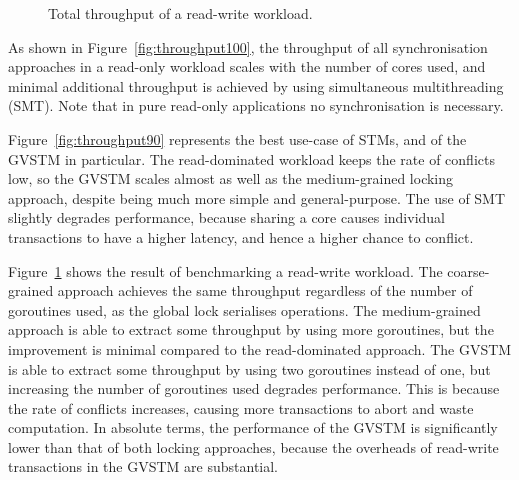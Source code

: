 \documentclass[12pt,a4paper,oneside,openright]{report}
\newcommand{\mycaption}[2]{\caption[#1]{#1 #2}}
\newcommand{\graphWidth}{15cm}
\begin{document}
\begin{figure}[htb]
  \mycaption{Total throughput of a read-write workload.}{}
  \label{fig:throughput60}
\end{figure}

As shown in Figure~\ref{fig:throughput100}, the throughput of all
synchronisation approaches in a read-only workload scales with the
number of cores used, and minimal additional throughput is achieved by
using simultaneous multithreading (SMT). Note that in pure read-only
applications no synchronisation is necessary.

Figure~\ref{fig:throughput90} represents the best use-case of STMs,
and of the GVSTM in particular. The read-dominated workload keeps the
rate of conflicts low, so the GVSTM scales almost as well as the
medium-grained locking approach, despite being much more simple and
general-purpose. The use of SMT slightly degrades performance, because
sharing a core causes individual transactions to have a higher
latency, and hence a higher chance to conflict.

Figure~\ref{fig:throughput60} shows the result of benchmarking a
read-write workload. The coarse-grained approach achieves the same
throughput regardless of the number of goroutines used, as the global
lock serialises operations. The medium-grained approach is able to
extract some throughput by using more goroutines, but the improvement
is minimal compared to the read-dominated approach. The GVSTM is able
to extract some throughput by using two goroutines instead of one, but
increasing the number of goroutines used degrades performance. This is
because the rate of conflicts increases, causing more transactions to
abort and waste computation. In absolute terms, the performance of the
GVSTM is significantly lower than that of both locking approaches,
because the overheads of read-write transactions in the GVSTM are
substantial.
\end{document}
